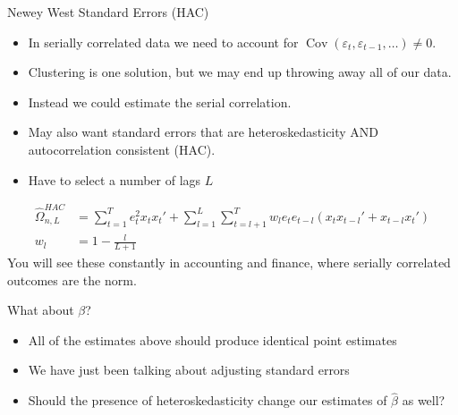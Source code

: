 \documentclass[aspectratio=169,11pt]{beamer}
\begin{document}
\begin{frame}{Newey West Standard Errors (HAC)}
\begin{itemize}
\item In serially correlated data we need to account for $\operatorname{ Cov } (\varepsilon_{t},\varepsilon_{t-1},\ldots ) \neq 0$.
\item Clustering is one solution, but we may end up throwing away all of our data.
\item Instead we could estimate the serial correlation.
\item May also want standard errors that are \alert{heteroskedasticity AND autocorrelation consistent} (HAC).
\item Have to select a number of lags $L$
\end{itemize}
\begin{align*}
\widehat { \Omega } _ { n,L }^{HAC} &= \sum _ { t = 1 } ^ { T }  e _ { t }^2 x_t x_t'  + \sum_{l=1}^L \sum _ { t = l+1 } ^ { T } w_l e_t e _ { t-l } \left( x_t x_{t-l}' +  x_{t-l} x_{t}'  \right)\\
w_l &= 1 - \frac{l}{L+1}
\end{align*}
You will see these constantly in accounting and finance, where serially correlated
outcomes are the norm.
\end{frame}


\begin{frame}{What about $\beta$?}
\begin{itemize}
\item All of the estimates above should produce \alert{identical} point estimates
\item We have just been talking about adjusting \alert{standard errors}
\item Should the presence of heteroskedasticity change our estimates of $\widehat{\beta}$ as well?
\end{itemize}
\end{frame}
\end{document}
